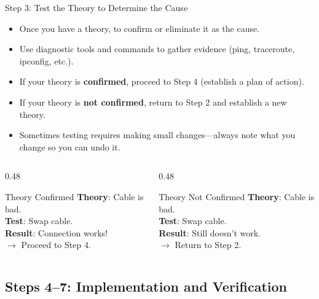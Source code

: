 \documentclass[aspectratio=169]{beamer}  %
\begin{document}
\begin{frame}{Step 3: Test the Theory to Determine the Cause}
    \begin{itemize}
        \item Once you have a theory,  to confirm or eliminate it as the cause.
        \item Use diagnostic tools and commands to gather evidence (ping, traceroute, ipconfig, etc.).
        \item If your theory is \textbf{confirmed}, proceed to Step 4 (establish a plan of action).
        \item If your theory is \textbf{not confirmed}, return to Step 2 and establish a new theory.
        \item Sometimes testing requires making small changes---always note what you change so you can undo it.
    \end{itemize}
    
    \begin{columns}[T]
        \begin{column}{0.48\textwidth}
            \begin{exampleblock}{Theory Confirmed}
                \small
                \textbf{Theory}: Cable is bad. \\
                \textbf{Test}: Swap cable. \\
                \textbf{Result}: Connection works! \\
                $\rightarrow$ Proceed to Step 4.
            \end{exampleblock}
        \end{column}
        \begin{column}{0.48\textwidth}
            \begin{alertblock}{Theory Not Confirmed}
                \small
                \textbf{Theory}: Cable is bad. \\
                \textbf{Test}: Swap cable. \\
                \textbf{Result}: Still doesn't work. \\
                $\rightarrow$ Return to Step 2.
            \end{alertblock}
        \end{column}
    \end{columns}
\end{frame}

\subsection{Steps 4--7: Implementation and Verification}
\end{document}
